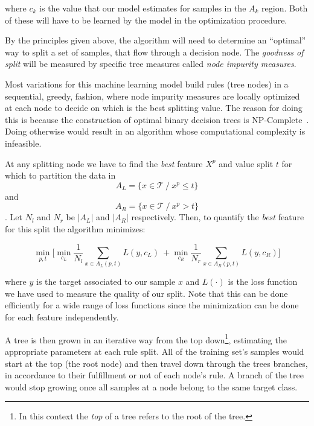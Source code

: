 where $c_k$ is the value that our model estimates for samples in the $A_k$ region.
Both of these will have to be learned by the model in the optimization procedure. %

By the principles given above, the algorithm will need to determine an ``optimal'' way to split a set of samples, that flow through a decision node.
The \textit{goodness of split} will be measured by specific tree measures called \textit{node impurity measures}.

Most variations for this machine learning model build rules (tree nodes) in a sequential, greedy, fashion, where node impurity measures are locally optimized at each node to decide on which is the best splitting value.
The reason for doing this is because the construction of optimal binary decision trees is NP-Complete~\cite{decisionTreesNP}.
Doing otherwise would result in an algorithm whose computational complexity is infeasible.

At any splitting node we have to find the \textit{best} feature $X^p$ and value split $t$ for which to partition the data in
$$A_L = \{x \in \mathcal{T} \ / \ x^p \leq t \} $$
and
$$A_R = \{x \in \mathcal{T}\ / \ x^p> t \} $$.
Let $N_l$ and $N_r$ be $|A_L|$ and $|A_R|$
 respectively.
 Then, to quantify the \textit{best} feature for this split the algorithm minimizes:


\begin{equation}
\label{eq:decisionTreeGreedyOptimization}
\min_{p,t} \big[ \min_{c_L }  \frac{1}{N_l}\sum_{x \in A_L(p,t) } L(y,c_L)    \ +  \min_{c_R}  \frac{1}{N_r}\sum_{x \in A_R(p,t) } L(y,c_R) \big]
\end{equation}

where $y$ is the target associated to our sample $x$ and $L(\cdot)$ is the loss function we have used to measure the quality of our split.
Note that this can be done efficiently for a wide range of loss functions since the minimization can be done for each feature independently.

A tree is then grown in an iterative way from the top down\footnote{In this context the \textit{top} of a tree refers to the root of the tree.}, estimating the appropriate parameters at each rule split.
All of the training set's samples would start at the top (the root node) and then travel down through the trees branches, in accordance to their fulfillment or not of each node's rule.
A branch of the tree would stop growing once all samples at a node belong to the same target class.

